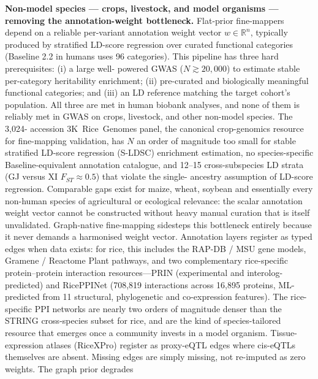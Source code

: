 \textbf{Non-model species --- crops, livestock, and model
organisms --- removing the annotation-weight bottleneck.}\label{disc:nonmodel} Flat-prior fine-mappers depend
on a reliable per-variant annotation weight vector
$w \in \mathbb{R}^n$, typically produced by stratified LD-score
regression over curated functional categories
(Baseline 2.2 in humans uses 96
categories)\cite{finucane2015partitioning,buliksullivan2015ld}.
This pipeline has three hard prerequisites: (i) a large well-
powered GWAS ($N \gtrsim 20{,}000$) to estimate stable
per-category heritability enrichment; (ii) pre-curated and
biologically meaningful functional categories; and (iii) an LD
reference matching the target cohort's population. All three
are met in human biobank analyses, and none of them is reliably
met in GWAS on crops, livestock, and other non-model species. The 3{,}024-
accession 3K~Rice~Genomes panel\cite{wang2018genomic}, the
canonical crop-genomics resource for fine-mapping validation,
has $N$ an order of magnitude too small for stable
stratified LD-score regression (S-LDSC)\cite{finucane2015partitioning}
enrichment estimation, no species-specific Baseline-equivalent
annotation catalogue, and 12--15 cross-subspecies LD strata
(GJ versus XI $F_{ST} \approx 0.5$) that violate the single-
ancestry assumption of LD-score regression. Comparable gaps
exist for maize, wheat, soybean and essentially every non-human
species of agricultural or ecological relevance: the scalar
annotation weight vector cannot be constructed without heavy
manual curation that is itself unvalidated. Graph-native
fine-mapping sidesteps this bottleneck entirely because it never
demands a harmonised weight vector. Annotation layers register
as typed edges when data exists: for rice, this includes the
RAP-DB / MSU gene models\cite{frankish2023gencode},
Gramene / Reactome Plant
pathways\cite{gillespie2022reactome}, and two complementary
rice-specific protein--protein interaction
resources---PRIN\cite{gu2011prin} (experimental and interolog-
predicted) and RicePPINet\cite{liu2017riceppinet} (708{,}819
interactions across 16{,}895 proteins, ML-predicted from 11
structural, phylogenetic and co-expression features). The
rice-specific PPI networks are nearly two orders of magnitude
denser than the STRING cross-species subset for rice, and are
the kind of species-tailored resource that emerges once a
community invests in a model organism. Tissue-expression
atlases (RiceXPro) register as proxy-eQTL edges where cis-eQTLs
themselves are absent. Missing edges are simply missing, not
re-imputed as zero weights. The graph prior degrades
